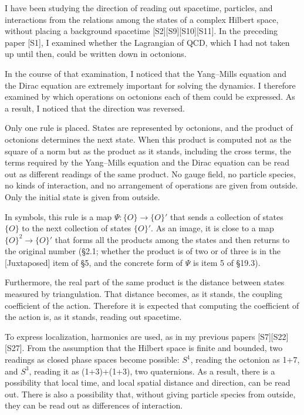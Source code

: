 \documentclass[
  a4paper,
]{article}
\begin{document}
I have been studying the direction of reading out spacetime, particles,
and interactions from the relations among the states of a complex
Hilbert space, without placing a background spacetime
{[}S2{]}{[}S9{]}{[}S10{]}{[}S11{]}. In the preceding paper {[}S1{]}, I
examined whether the Lagrangian of QCD, which I had not taken up until
then, could be written down in octonions.

In the course of that examination, I noticed that the Yang--Mills
equation and the Dirac equation are extremely important for solving the
dynamics. I therefore examined by which operations on octonions each of
them could be expressed. As a result, I noticed that the direction was
reversed.

Only one rule is placed. States are represented by octonions, and the
product of octonions determines the next state. When this product is
computed not as the square of a norm but as the product as it stands,
including the cross terms, the terms required by the Yang--Mills
equation and the Dirac equation can be read out as different readings of
the same product. No gauge field, no particle species, no kinds of
interaction, and no arrangement of operations are given from outside.
Only the initial state is given from outside.

In symbols, this rule is a map \(\Psi : \{O\} \to \{O\}'\) that sends a
collection of states \(\{O\}\) to the next collection of states
\(\{O\}'\). As an image, it is close to a map \(\{O\}^2 \to \{O\}'\)
that forms all the products among the states and then returns to the
original number (§2.1; whether the product is of two or of three is in
the {[}Juxtaposed{]} item of §5, and the concrete form of \(\Psi\) is
item 5 of §19.3).

Furthermore, the real part of the same product is the distance between
states measured by triangulation. That distance becomes, as it stands,
the coupling coefficient of the action. Therefore it is expected that
computing the coefficient of the action is, as it stands, reading out
spacetime.

To express localization, harmonics are used, as in my previous papers
{[}S7{]}{[}S22{]}{[}S27{]}. From the assumption that the Hilbert space
is finite and bounded, two readings as closed phase spaces become
possible: \(S^1\), reading the octonion as 1+7, and \(S^3\), reading it
as (1+3)+(1+3), two quaternions. As a result, there is a possibility
that local time, and local spatial distance and direction, can be read
out. There is also a possibility that, without giving particle species
from outside, they can be read out as differences of interaction.
\end{document}
